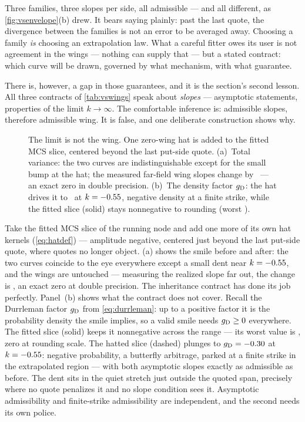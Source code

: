 Three families, three slopes per side, all admissible --- and all
different, as \cref{fig:vsenvelope}(b) drew.  It bears saying plainly:
past the last quote, the divergence between the families is not an
error to be averaged away.  Choosing a family \emph{is} choosing an
extrapolation law.  What a careful fitter owes its user is not
agreement in the wings --- nothing can supply that --- but a stated
contract: which curve will be drawn, governed by what mechanism, with
what guarantee.

There is, however, a gap in those guarantees, and it is the section's
second lesson.  All three contracts of \cref{tab:vswings} speak about
\emph{slopes} --- asymptotic statements, properties of the limit
$k\to\infty$.  The comfortable inference is: admissible slopes,
therefore admissible wing.  It is false, and one deliberate
construction shows why.

\begin{figure}[htbp]
\centering
{}
\caption{The limit is not the wing.  One zero-wing hat is added to
the fitted MCS slice, centered beyond the last put-side quote.
(a)~Total variance: the two curves are indistinguishable except for
the small bump at the hat; the measured far-field wing slopes change
by \MacWingHatSlopeDiff\ --- an exact zero in double precision.
(b)~The density factor $g_{\rm D}$: the hat drives it to
\MacWingHatGmin\ at $k=-0.55$, negative density at a finite
strike, while the fitted slice (solid) stays nonnegative to rounding
(worst \MacWingHatBaseGmin).}
\label{fig:winglimit}
\end{figure}

Take the fitted MCS slice of the running node and add one more of its
own hat kernels (\cref{eq:hatdef}) --- amplitude negative, centered
just beyond the last put-side quote, where quotes no longer object.
(a) shows the smile before and after: the two
curves coincide to the eye everywhere except a small dent near
$k=-0.55$, and the wings are untouched --- measuring the
realized slope far out, the change is \MacWingHatSlopeDiff, an exact
zero at double precision.  The inheritance contract has done its job
perfectly.  Panel~(b) shows what the contract does not cover.  Recall
the Durrleman factor $g_{\rm D}$ from \cref{eq:durrleman}: up to a
positive factor it is the probability density the smile implies, so a
valid smile needs $g_{\rm D}\ge0$ everywhere.  The fitted slice
(solid) keeps it nonnegative across the range --- its worst value is
\MacWingHatBaseGmin, zero at rounding scale.  The hatted slice
(dashed) plunges to $g_{\rm D}=-0.30$ at
$k=-0.55$: negative probability, a butterfly arbitrage,
parked at a finite strike in the extrapolated region --- with both
asymptotic slopes exactly as admissible as before.  The dent sits in
the quiet stretch just outside the quoted span, precisely where no
quote penalizes it and no slope condition sees it.  Asymptotic
admissibility and finite-strike admissibility are independent, and
the second needs its own police.

